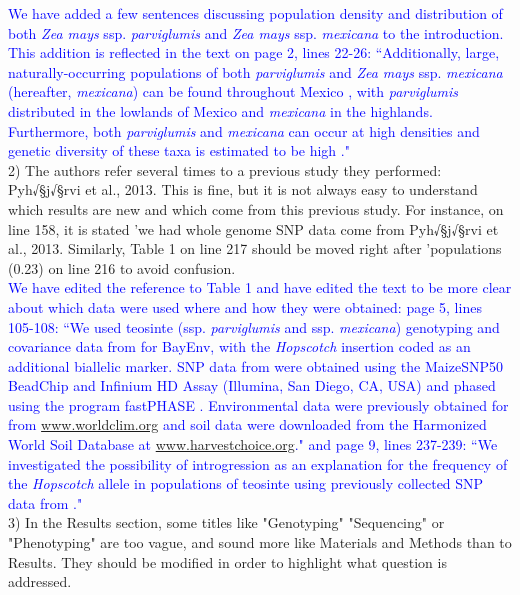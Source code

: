 \documentclass[11pt]{article}
\newcommand{\res}[1]{\noindent \textcolor{blue}{{#1}} \\}
\begin{document}
\res{We have added a few sentences discussing population density and distribution of both \emph{Zea mays} ssp. \emph{parviglumis} and \emph{Zea mays} ssp. \emph{mexicana} to the introduction. This addition is reflected in the text on page 2, lines 22-26: ``Additionally, large, naturally-occurring populations of both \emph{parviglumis} and \emph{Zea mays} ssp. \emph{mexicana} (hereafter, \emph{mexicana}) can be found throughout Mexico \citep{Wilkes1977, Hufford2013}, with \emph{parviglumis} distributed in the lowlands of Mexico and \emph{mexicana} in the highlands. Furthermore, both \emph{parviglumis} and \emph{mexicana} can occur at high densities and genetic diversity of these taxa is estimated to be high \citep{Hufford2012a, Ross-Ibarra2009}."}

2) The authors refer several times to a previous study they performed: Pyh√§j√§rvi et al., 2013. This is fine, but it is not always easy to understand which results are new and which come from this previous study. For instance, on line 158, it is stated 'we had whole genome SNP data come from Pyh√§j√§rvi et al., 2013. Similarly, Table 1 on line 217 should be moved right after 'populations (0.23) on line 216 to avoid confusion.\\

\res{We have edited the reference to Table 1 and have edited the text to be more clear about which data were used where and how they were obtained: page 5, lines 105-108: ``We used teosinte (ssp. \emph{parviglumis} and ssp. \emph{mexicana}) genotyping and covariance data from \citet{Pyhajarvi2013} for BayEnv, with the \emph{Hopscotch} insertion coded as an additional biallelic marker. SNP data from \citet{Pyhajarvi2013} were obtained using the MaizeSNP50 BeadChip and Infinium HD Assay (Illumina, San Diego, CA, USA) and phased using the program fastPHASE \citep{Scheet2006}. Environmental data were previously obtained for \citet{Pyhajarvi2013} from \url{www.worldclim.org} and soil data were downloaded from the Harmonized World Soil Database \citep{FAOHWSD} at \url{www.harvestchoice.org}." and page 9, lines 237-239: ``We investigated the possibility of introgression as an explanation for the frequency of the \emph{Hopscotch} allele in populations of teosinte using previously collected SNP data from \citep{Pyhajarvi2013}."}

3) In the Results section, some titles like "Genotyping" "Sequencing" or "Phenotyping" are too vague, and sound more like Materials and Methods than to Results. They should be modified in order to highlight what question is addressed.\\
\end{document}
